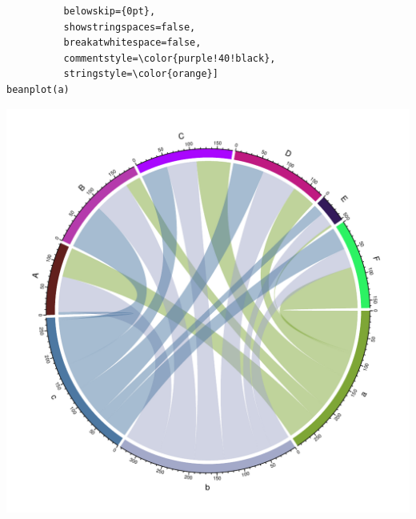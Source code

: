\documentclass{tufte-book}\usepackage[]{graphicx}\usepackage[]{color}
\makeatletter
\def\maxwidth{ %
  \ifdim\Gin@nat@width>\linewidth
    \linewidth
  \else
    \Gin@nat@width
  \fi
}
\newenvironment{kframe}{%
 \def\at@end@of@kframe{}%
 \ifinner\ifhmode%
  \def\at@end@of@kframe{\end{minipage}}%
  \begin{minipage}{\columnwidth}%
 \fi\fi%
 \def\FrameCommand##1{\hskip\@totalleftmargin \hskip-\fboxsep
 \colorbox{shadecolor}{##1}\hskip-\fboxsep
     \hskip-\linewidth \hskip-\@totalleftmargin \hskip\columnwidth}%
 \MakeFramed {\advance\hsize-\width
   \@totalleftmargin\z@ \linewidth\hsize
   \@setminipage}}%
 {\par\unskip\endMakeFramed%
 \at@end@of@kframe}
\newenvironment{knitrout}{}{} %
\makeatother
\begin{document}
\begin{knitrout}
\begin{kframe}
\begin{lstlisting}
          belowskip={0pt},
          showstringspaces=false,
          breakatwhitespace=false,
          commentstyle=\color{purple!40!black},
          stringstyle=\color{orange}]
beanplot(a)\end{lstlisting}
\end{kframe}
\includegraphics[width=\maxwidth]{figure/unnamed-chunk-1-1} 

\end{knitrout}
\end{document}

